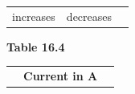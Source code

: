 \begin{enumerate}[noitemsep, label=\textbf{\arabic*}. ]
\begin{enumerate}[noitemsep, label=\textbf{\alph*}. ]
{{\begin{center}
\begin{tabular}[t]{|l|l|l|}
    
        increases &
    
    
        decreases%
     \tabularnewline\cline{1-1}\cline{2-2}\cline{3-3}
    \end{tabular}
      \end{center}
    \begin{center}{\small\bfseries Table 16.4}\end{center}
    
    \addtocounter{footnote}{-0}
    
          }{ %
        
    
        \begin{center}
      
      \label{m38776*id68590}
      
    \noindent
      \tablelasttail{}
      \begin{xtabular}[t]{|l|l|l|}\hline
    
    
         &
    
    
        \textbf{Current in A} &
    
    

\end{xtabular}
\end{center}}}
\end{enumerate}
\end{enumerate}
